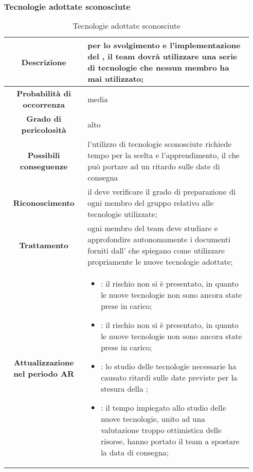 \documentclass[PianoDiProgetto.tex]{subfiles}
\begin{document}
		\subsubsection{Tecnologie adottate sconosciute}
			\label{sec:tas}
	\begin{table}[h]
		\begin{center}
			\begin{tabular}{ | c | p{10cm} |}
				\hline
					\textbf{Descrizione}& per lo svolgimento e l'implementazione del \gl{progetto}, il team dovrà utilizzare una serie di tecnologie che nessun membro ha mai utilizzato; \\ \hline
				\textbf{Probabilità di occorrenza} & media  \\ \hline
				\textbf{Grado di pericolosità} & alto \\ \hline
				\textbf{Possibili conseguenze} & l'utilizzo di tecnologie sconosciute richiede tempo per la scelta e l'apprendimento, il che può portare ad un ritardo sulle date di consegna \\ \hline
				\textbf{Riconoscimento} & il \RESP{} deve verificare il grado di preparazione di ogni membro del gruppo relativo alle tecnologie utilizzate; \\ \hline
				\textbf{Trattamento} &  ogni membro del team deve studiare e approfondire autonomamente i documenti forniti dall'\AMM{} che spiegano come utilizzare propriamente le nuove tecnologie adottate; \\ \hline
				\textbf{Attualizzazione nel periodo AR} & \begin{itemize} 
				\item \PerAR: il rischio non si è presentato, in quanto le nuove tecnologie non sono ancora state prese in carico;
				\item \PerAD: il rischio non si è presentato, in quanto le nuove tecnologie non sono ancora state prese in carico;
				\item \PerPA: lo studio delle tecnologie necessarie ha causato ritardi sulle date previste per la stesura della \DPdoc{};
				\item \PerPD: il tempo impiegato allo studio delle nuove tecnologie, unito ad una valutazione troppo ottimistica delle risorse, hanno portato il team a spostare la data di consegna;
				\end{itemize} \\
				\hline
				
			\end{tabular}
		\caption{Tecnologie adottate sconosciute}
		\end{center}	
	\end{table}
\end{document}
